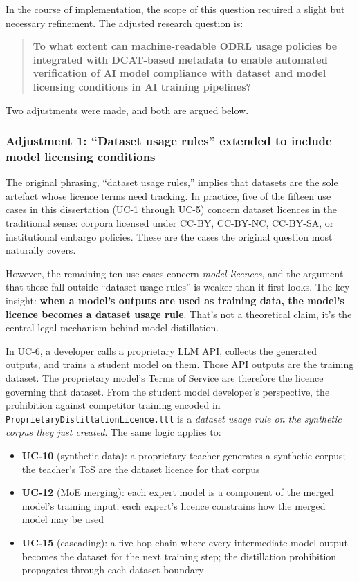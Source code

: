 \documentclass[12pt,a4paper]{article}
\begin{document}
\noindent In the course of implementation, the scope of this question required a slight but necessary refinement. The adjusted research question is:

\begin{quote}
\textbf{To what extent can machine-readable ODRL usage policies be integrated with DCAT-based metadata to enable automated verification of AI model compliance with dataset and model licensing conditions in AI training pipelines?}
\end{quote}

Two adjustments were made, and both are argued below.

\subsubsection*{Adjustment 1: ``Dataset usage rules'' extended to include model licensing conditions}

The original phrasing, ``dataset usage rules,'' implies that datasets are the sole artefact whose licence terms need tracking. In practice, five of the fifteen use cases in this dissertation (UC-1 through UC-5) concern dataset licences in the traditional sense: corpora licensed under CC-BY, CC-BY-NC, CC-BY-SA, or institutional embargo policies. These are the cases the original question most naturally covers.

However, the remaining ten use cases concern \emph{model licences}, and the argument that these fall outside ``dataset usage rules'' is weaker than it first looks. The key insight: \textbf{when a model's outputs are used as training data, the model's licence becomes a dataset usage rule}. That's not a theoretical claim, it's the central legal mechanism behind model distillation.

In UC-6, a developer calls a proprietary LLM API, collects the generated outputs, and trains a student model on them. Those API outputs are the training dataset. The proprietary model's Terms of Service are therefore the licence governing that dataset. From the student model developer's perspective, the prohibition against competitor training encoded in \texttt{ProprietaryDistillationLicence.ttl} is a \emph{dataset usage rule on the synthetic corpus they just created}. The same logic applies to:

\begin{itemize}[noitemsep]
  \item \textbf{UC-10} (synthetic data): a proprietary teacher generates a synthetic corpus; the teacher's ToS are the dataset licence for that corpus
  \item \textbf{UC-12} (MoE merging): each expert model is a component of the merged model's training input; each expert's licence constrains how the merged model may be used
  \item \textbf{UC-15} (cascading): a five-hop chain where every intermediate model output becomes the dataset for the next training step; the distillation prohibition propagates through each dataset boundary
\end{itemize}
\end{document}
